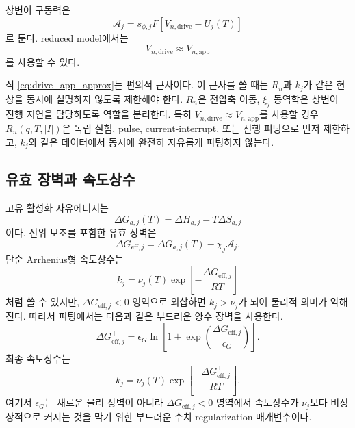 \documentclass[11pt,a4paper]{article}
\newcommand{\app}{\mathrm{app}}
\newcommand{\drive}{\mathrm{drive}}
\newcommand{\eff}{\mathrm{eff}}
\begin{document}
상변이 구동력은
\begin{equation}
\mathcal A_j=s_{\phi,j}F\left[V_{n,\drive}-U_j(T)\right]
\label{eq:A_drive}
\end{equation}
로 둔다. reduced model에서는
\begin{equation}
V_{n,\drive}\approx V_{n,\app}
\label{eq:drive_app_approx}
\end{equation}
를 사용할 수 있다.

\begin{mdframed}
식 \eqref{eq:drive_app_approx}는 편의적 근사이다. 이 근사를 쓸 때는 \(R_n\)과 \(k_j\)가 같은 현상을 동시에 설명하지 않도록 제한해야 한다. \(R_n\)은 전압축 이동, \(\xi_j\) 동역학은 상변이 진행 지연을 담당하도록 역할을 분리한다. 특히 \(V_{n,\drive}\approx V_{n,\app}\)를 사용할 경우 \(R_n(q,T,|I|)\)은 독립 실험, pulse, current-interrupt, 또는 선행 피팅으로 먼저 제한하고, \(k_j\)와 같은 데이터에서 동시에 완전히 자유롭게 피팅하지 않는다.
\end{mdframed}

\subsection{유효 장벽과 속도상수}
고유 활성화 자유에너지는
\begin{equation}
\Delta G_{a,j}(T)=\Delta H_{a,j}-T\Delta S_{a,j}
\end{equation}
이다. 전위 보조를 포함한 유효 장벽은
\begin{equation}
\Delta G_{\eff,j}=\Delta G_{a,j}(T)-\chi_j\mathcal A_j.
\label{eq:Geff}
\end{equation}
단순 Arrhenius형 속도상수는
\begin{equation}
k_j=\nu_j(T)\exp\left[-\frac{\Delta G_{\eff,j}}{RT}\right]
\end{equation}
처럼 쓸 수 있지만, \(\Delta G_{\eff,j}<0\) 영역으로 외삽하면 \(k_j>\nu_j\)가 되어 물리적 의미가 약해진다. 따라서 피팅에서는 다음과 같은 부드러운 양수 장벽을 사용한다.
\begin{equation}
\Delta G_{\eff,j}^{+}=\epsilon_G\ln\left[1+\exp\left(\frac{\Delta G_{\eff,j}}{\epsilon_G}\right)\right].
\label{eq:softplus_barrier}
\end{equation}
최종 속도상수는
\begin{equation}
\boxed{
k_j=\nu_j(T)\exp\left[-\frac{\Delta G_{\eff,j}^{+}}{RT}\right].
}
\label{eq:k_single}
\end{equation}
여기서 \(\epsilon_G\)는 새로운 물리 장벽이 아니라 \(\Delta G_{\eff,j}<0\) 영역에서 속도상수가 \(\nu_j\)보다 비정상적으로 커지는 것을 막기 위한 부드러운 수치 regularization 매개변수이다.
\end{document}
